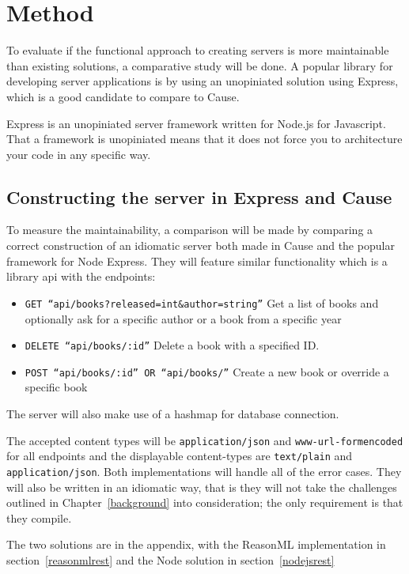\chapter{Method}

To evaluate if the functional approach to creating servers is more maintainable
than existing solutions, a comparative study will be done. A popular library for
developing server applications is by using an unopiniated solution using
Express, which is a good candidate to compare to Cause.

Express is an unopiniated server framework written for Node.js for Javascript.
That a framework is unopiniated means that it does not force you to architecture
your code in any specific way.  

\section{Constructing the server in Express and Cause}

To measure the maintainability, a comparison will be made by comparing a correct
construction of an idiomatic server both made in Cause and the popular framework
for Node Express. They will feature similar functionality which is a library api
with the endpoints:

\begin{itemize}
    \item \texttt{GET ``api/books?released=int\&author=string''} Get a list of
    books and optionally ask for a specific author or a book from a specific
    year
    \item \texttt{DELETE ``api/books/:id''} Delete a book with a specified ID.
    \item \texttt{POST ``api/books/:id'' OR ``api/books/''} Create a new book or
    override a specific book
\end{itemize}

The server will also make use of a hashmap for database connection.

The accepted content types will be \texttt{application/json} and
\texttt{www-url-formencoded} for all endpoints and the displayable content-types
are \texttt{text/plain} and \texttt{application/json}. Both implementations will handle
all of the error cases. They will also be written in an idiomatic way, that is
they will not take the challenges outlined in Chapter~\ref{background} into
consideration; the only requirement is that they compile.

The two solutions are in the appendix, with the ReasonML implementation in
section~\ref{reasonmlrest} and the Node solution in section~\ref{nodejsrest}

